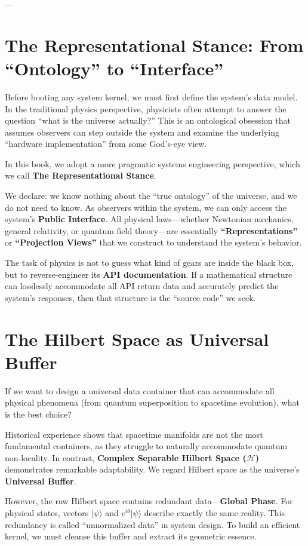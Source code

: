 \documentclass[11pt,a4paper,twoside]{book}
\begin{document}
---

\section{The Representational Stance: From ``Ontology'' to ``Interface''}

Before booting any system kernel, we must first define the system's data model. In the traditional physics perspective, physicists often attempt to answer the question ``what is the universe actually?'' This is an ontological obsession that assumes observers can step outside the system and examine the underlying ``hardware implementation'' from some God's-eye view.

In this book, we adopt a more pragmatic systems engineering perspective, which we call \textbf{The Representational Stance}.

We declare: we know nothing about the ``true ontology'' of the universe, and we do not need to know. As observers within the system, we can only access the system's \textbf{Public Interface}. All physical laws---whether Newtonian mechanics, general relativity, or quantum field theory---are essentially \textbf{``Representations''} or \textbf{``Projection Views''} that we construct to understand the system's behavior.

The task of physics is not to guess what kind of gears are inside the black box, but to reverse-engineer its \textbf{API documentation}. If a mathematical structure can losslessly accommodate all API return data and accurately predict the system's responses, then that structure is the ``source code'' we seek.

\section{The Hilbert Space as Universal Buffer}

If we want to design a universal data container that can accommodate all physical phenomena (from quantum superposition to spacetime evolution), what is the best choice?

Historical experience shows that spacetime manifolds are not the most fundamental containers, as they struggle to naturally accommodate quantum non-locality. In contrast, \textbf{Complex Separable Hilbert Space ($\mathcal{H}$)} demonstrates remarkable adaptability. We regard Hilbert space as the universe's \textbf{Universal Buffer}.

However, the raw Hilbert space contains redundant data---\textbf{Global Phase}. For physical states, vectors $|\psi\rangle$ and $e^{i\theta}|\psi\rangle$ describe exactly the same reality. This redundancy is called ``unnormalized data'' in system design. To build an efficient kernel, we must cleanse this buffer and extract its geometric essence.
\end{document}
